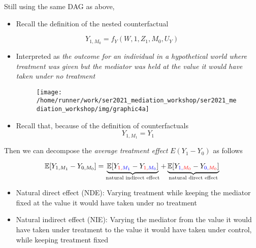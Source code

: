 \documentclass[
  12pt,
]{book}
\providecommand{\tightlist}{%
  \setlength{\itemsep}{0pt}\setlength{\parskip}{0pt}}
\theoremstyle{definition}
\theoremstyle{definition}
\theoremstyle{definition}
\newcommand{\E}{\mathbb{E}}
\newcommand{\1}{\mathbbm{1}}
\begin{document}
Still using the same DAG as above,

\begin{itemize}
\tightlist
\item
  Recall the definition of the nested counterfactual
\end{itemize}

\begin{equation*}
    Y_{1, M_0} = f_Y(W, 1, Z_1, M_0, U_Y)
\end{equation*}

\begin{itemize}
\item
  Interpreted as \emph{the outcome for an individual in a hypothetical world where
  treatment was given but the mediator was held at the value it would have
  taken under no treatment}

  \begin{figure}

  {\centering \texttt{[image: /home/runner/work/ser2021\_mediation\_workshop/ser2021\_mediation\_workshop/img/graphic4a]} 

  }

  \end{figure}
\item
  Recall that, because of the definition of counterfactuals
  \begin{equation*}
  Y_{1, M_1} = Y_1
  \end{equation*}
\end{itemize}

Then we can decompose the \emph{average treatment effect} \(E(Y_1-Y_0)\) as follows

\begin{equation*}
\E[Y_{1,M_1} - Y_{0,M_0}] = \underbrace{\E[Y_{\color{red}{1},\color{blue}{M_1}} -
    Y_{\color{red}{1},\color{blue}{M_0}}]}_{\text{natural indirect effect}} +
    \underbrace{\E[Y_{\color{blue}{1},\color{red}{M_0}} -
    Y_{\color{blue}{0},\color{red}{M_0}}]}_{\text{natural direct effect}}
\end{equation*}

\begin{itemize}
\tightlist
\item
  Natural direct effect (NDE): Varying treatment while keeping the mediator
  fixed at the value it would have taken under no treatment
\item
  Natural indirect effect (NIE): Varying the mediator from the value it would
  have taken under treatment to the value it would have taken under control,
  while keeping treatment fixed
\end{itemize}
\end{document}
